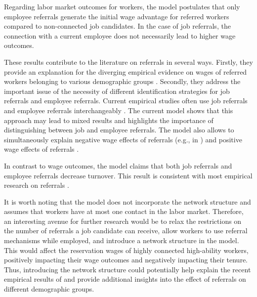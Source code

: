 \documentclass[12pt]{article}
\begin{document}
Regarding labor market outcomes for workers, the model postulates that only employee referrals generate the initial wage advantage for referred workers compared to non-connected job candidates. In the case of job referrals, the connection with a current employee does not necessarily lead to higher wage outcomes. 

These results contribute to the literature on referrals in several ways. Firstly, they provide an explanation for the diverging empirical evidence on wages of referred workers belonging to various demographic groups \citep{corcoran1980most, campbell1985job, elliott1999social, green1999racial, korenman1996employment}. Secondly, they address the important issue of the necessity of different identification strategies for job referrals and employee referrals. Current empirical studies often use job referrals and employee referrals interchangeably \citep{lester2021heterogeneous}. The current model shows that this approach may lead to mixed results and highlights the importance of distinguishing between job and employee referrals. The model also allows to simultaneously explain negative wage effects of referrals (e.g., in \cite{heath2018firms}) and positive wage effects of referrals \citep{dustmann2016referral, brown2016informal, lester2021heterogeneous}.

In contrast to wage outcomes, the model claims that both job referrals and employee referrals decrease turnover. This result is consistent with most empirical research on referrals \citep{datcher1983impact, galenianos2013learning, burks2015value, heath2018firms, levati2020impact}.

It is worth noting that the model does not incorporate the network structure and assumes that workers have at most one contact in the labor market. Therefore, an interesting avenue for further research would be to relax the restrictions on the number of referrals a job candidate can receive, allow workers to use referral mechanisms while employed, and introduce a network structure in the model. This would affect the reservation wages of highly connected high-ability workers, positively impacting their wage outcomes and negatively impacting their tenure. Thus, introducing the network structure could potentially help explain the recent empirical results of \cite{lester2021heterogeneous} and provide additional insights into the effect of referrals on different demographic groups.

\end{document}
